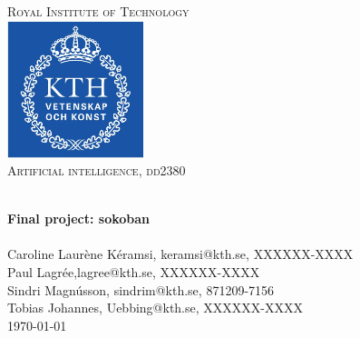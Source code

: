 \documentclass[a4paper,10pt]{article}
\title{}
\author{}
\begin{document}
\begin{titlepage}
\begin{center}


\textsc{\LARGE Royal Institute of Technology}\\[1.5cm]

\includegraphics[width=0.3\textwidth]{kth_mathematics_rgb.jpg}\\[1cm]

\textsc{\Large Artificial intelligence, dd2380 }  %

\hrulefill \\[0.4cm]
{ \huge \bfseries Final project: sokoban}\\[0.4cm]
\hrulefill \\[1.5cm]



    Caroline Laurène Kéramsi, keramsi@kth.se, XXXXXX-XXXX \\
    Paul Lagrée,lagree@kth.se, XXXXXX-XXXX \\
    Sindri Magnússon, sindrim@kth.se, 871209-7156 \\
    Tobias Johannes, Uebbing@kth.se, XXXXXX-XXXX \\


\vfill
{\large \today}

\end{center}
\end{titlepage}


\cleardoublepage
\tableofcontents
\newpage



 
\end{document}
